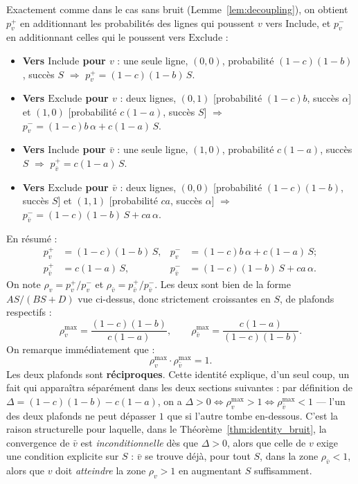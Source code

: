 \documentclass[12pt,a4paper]{article}
\theoremstyle{remark}
\newcommand{\Inc}{\ensuremath{\mathrm{Include}}}
\newcommand{\Exc}{\ensuremath{\mathrm{Exclude}}}
\newcommand{\vbar}{\bar{v}}
\begin{document}
Exactement comme dans le cas sans bruit (Lemme~\ref{lem:decoupling}), on obtient $p^+_v$
en additionnant les probabilités des lignes qui poussent $v$ vers \Inc, et $p^-_v$ en
additionnant celles qui le poussent vers \Exc{} :
\begin{itemize}
  \item \textbf{Vers \Inc{} pour $v$} : une seule ligne, $(0,0)$, probabilité
  $(1-c)(1-b)$, succès $S$ $\Rightarrow$ $p^+_v = (1-c)(1-b)\,S$.
  \item \textbf{Vers \Exc{} pour $v$} : deux lignes, $(0,1)$ [probabilité $(1-c)b$,
  succès $\alpha$] et $(1,0)$ [probabilité $c(1-a)$, succès $S$]
  $\Rightarrow$ $p^-_v = (1-c)b\,\alpha + c(1-a)\,S$.
  \item \textbf{Vers \Inc{} pour $\vbar$} : une seule ligne, $(1,0)$, probabilité
  $c(1-a)$, succès $S$ $\Rightarrow$ $p^+_{\vbar} = c(1-a)\,S$.
  \item \textbf{Vers \Exc{} pour $\vbar$} : deux lignes, $(0,0)$ [probabilité
  $(1-c)(1-b)$, succès $S$] et $(1,1)$ [probabilité $ca$, succès $\alpha$]
  $\Rightarrow$ $p^-_{\vbar} = (1-c)(1-b)\,S + ca\,\alpha$.
\end{itemize}
En résumé :
\begin{align}
  p^+_v &= (1-c)(1-b)\,S, &
  p^-_v &= (1-c)b\,\alpha + c(1-a)\,S; \label{eq:pv_id}\\[4pt]
  p^+_{\vbar} &= c(1-a)\,S, &
  p^-_{\vbar} &= (1-c)(1-b)\,S + ca\,\alpha. \label{eq:pvbar_id}
\end{align}
On note $\rho_v = p^+_v/p^-_v$ et $\rho_{\vbar} = p^+_{\vbar}/p^-_{\vbar}$. Les deux sont
bien de la forme $AS/(BS+D)$ vue ci-dessus, donc strictement croissantes en $S$, de
plafonds respectifs :
\[
  \rho_v^{\max} = \frac{(1-c)(1-b)}{c(1-a)},
  \qquad
  \rho_{\vbar}^{\max} = \frac{c(1-a)}{(1-c)(1-b)}.
\]
On remarque immédiatement que :
\[
  \boxed{\rho_v^{\max} \cdot \rho_{\vbar}^{\max} = 1.}
\]
Les deux plafonds sont \textbf{réciproques}. Cette identité explique, d'un seul coup,
un fait qui apparaîtra séparément dans les deux sections suivantes : par définition de
$\Delta=(1-c)(1-b)-c(1-a)$, on a $\Delta>0 \iff \rho_v^{\max}>1 \iff
\rho_{\vbar}^{\max}<1$ — l'un des deux plafonds ne peut dépasser $1$ que si l'autre
tombe en-dessous. C'est la raison structurelle pour laquelle, dans le
Théorème~\ref{thm:identity_bruit}, la convergence de $\vbar$ est
\emph{inconditionnelle} dès que $\Delta>0$, alors que celle de $v$ exige une condition
explicite sur $S$ : $\vbar$ se trouve déjà, pour tout $S$, dans la zone $\rho_{\vbar}<1$,
alors que $v$ doit \emph{atteindre} la zone $\rho_v>1$ en augmentant $S$ suffisamment.
\end{document}

